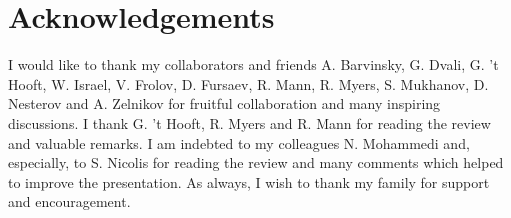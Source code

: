 \documentclass[12pt]{article}
\begin{document}
             
             
                                   
                        
                                    

\section{Acknowledgements}
\label{section:acknowledgements}

I would like to thank my collaborators and friends A. Barvinsky, G. Dvali, G. 't Hooft, W. Israel, V. Frolov, D. Fursaev, R. Mann, R. Myers, S. Mukhanov,  D. Nesterov  and A. Zelnikov
for fruitful collaboration and many inspiring discussions.
I thank G. 't Hooft, R. Myers and R. Mann for reading the review and valuable remarks.
I am indebted to my colleagues N. Mohammedi and, especially, to S. Nicolis for reading the review and  many comments which helped to improve  the presentation. 
As always, I wish to thank my family for support and encouragement. 

\newpage




\end{document}
